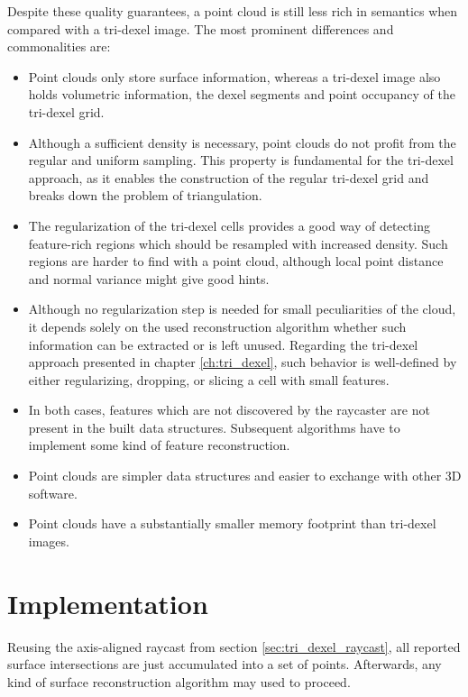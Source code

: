 Despite these quality guarantees, a point cloud is still less rich in semantics when compared with a tri-dexel image.
The most prominent differences and commonalities are:
\begin{itemize}
	\item
	Point clouds only store surface information, whereas a tri-dexel image also holds volumetric information, \ie the dexel segments and point occupancy of the tri-dexel grid.
	\item
	Although a sufficient density is necessary, point clouds do not profit from the regular and uniform sampling.
	This property is fundamental for the tri-dexel approach, as it enables the construction of the regular tri-dexel grid and breaks down the problem of triangulation.
	\item
	The regularization of the tri-dexel cells provides a good way of detecting feature-rich regions which should be resampled with increased density.
	Such regions are harder to find with a point cloud, although local point distance and normal variance might give good hints.
	\item
	Although no regularization step is needed for small peculiarities of the cloud, it depends solely on the used reconstruction algorithm whether such information can be extracted or is left unused.
	Regarding the tri-dexel approach presented in chapter \ref{ch:tri_dexel}, such behavior is well-defined by either regularizing, \ie dropping, or slicing a cell with small features.
	\item
	In both cases, features which are not discovered by the raycaster are not present in the built data structures.
	Subsequent algorithms have to implement some kind of feature reconstruction.
	\item
	Point clouds are simpler data structures and easier to exchange with other 3D software.
	\item
	Point clouds have a substantially smaller memory footprint than tri-dexel images.
\end{itemize}


\section{Implementation}
\label{sec:point_cloud_implementation}

Reusing the axis-aligned raycast from section \ref{sec:tri_dexel_raycast}, all reported surface intersections are just accumulated into a set of points.
Afterwards, any kind of surface reconstruction algorithm may used to proceed.

